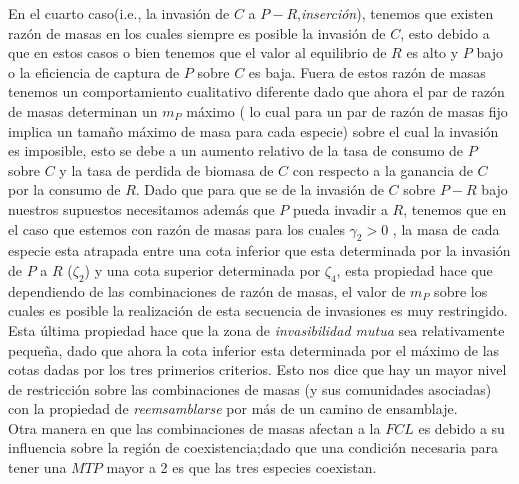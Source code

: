 En el cuarto caso(i.e., la invasi\'on de $C$ a $P-R$,\emph{inserci\'on}), tenemos que existen raz\'on de masas en los cuales siempre es posible la invasi\'on de $C$, esto debido a que en estos casos o bien tenemos que el valor al equilibrio de $R$ es alto y $P$ bajo o la eficiencia de captura de $P$ sobre $C$ es baja. Fuera de estos raz\'on de masas tenemos un comportamiento cualitativo diferente dado que ahora el par de raz\'on de masas determinan un $m_P$ m\'aximo ( lo cual para un par de raz\'on de masas fijo implica un tama\~no m\'aximo de masa para cada especie) sobre el cual la invasi\'on es imposible, esto se debe a un aumento relativo de la tasa de consumo de $P$ sobre $C$ y la tasa de perdida de biomasa de $C$ con respecto a la ganancia de $C$ por la consumo de $R$. Dado que para que se de la invasi\'on de $C$ sobre $P-R$ bajo nuestros supuestos necesitamos adem\'as que $P$ pueda invadir a $R$, tenemos que en el caso que estemos con raz\'on de masas para los cuales $\gamma_2 >0$ , la masa de cada especie esta atrapada entre una cota inferior que esta determinada por la invasi\'on de $P$ a $R$ ($\zeta_2$) y una cota superior determinada por $\zeta_4$, esta propiedad hace que dependiendo de las combinaciones de raz\'on de masas, el valor de $m_P$ sobre los cuales es posible la realizaci\'on de esta secuencia de invasiones es muy restringido.\\

Esta \'ultima propiedad hace que la zona de \emph{invasibilidad mutua} sea relativamente peque\~na, dado que ahora la cota inferior esta determinada por el m\'aximo de las cotas dadas por los tres primerios criterios. Esto nos dice que hay un mayor nivel de restricci\'on sobre las combinaciones de masas (y sus comunidades asociadas) con la propiedad de \emph{reemsamblarse} por m\'as de un camino de ensamblaje.\\

Otra manera en que las combinaciones de masas afectan a la $FCL$ es debido a su influencia sobre la regi\'on de coexistencia;dado que una condici\'on necesaria para tener una $MTP$ mayor a 2 es que las tres especies coexistan.\\

